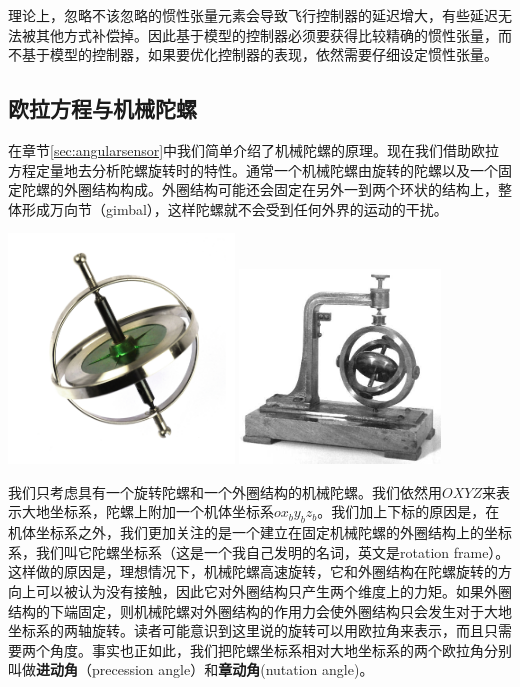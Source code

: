 \documentclass[11pt]{article}
\begin{document}
理论上，忽略不该忽略的惯性张量元素会导致飞行控制器的延迟增大，有些延迟无法被其他方式补偿掉。因此基于模型的控制器必须要获得比较精确的惯性张量，而不基于模型的控制器，如果要优化控制器的表现，依然需要仔细设定惯性张量。

\subsection{欧拉方程与机械陀螺}\label{sec:eulereqngyro}
在章节\ref{sec:angularsensor}中我们简单介绍了机械陀螺的原理。现在我们借助欧拉方程定量地去分析陀螺旋转时的特性。通常一个机械陀螺由旋转的陀螺以及一个固定陀螺的外圈结构构成。外圈结构可能还会固定在另外一到两个环状的结构上，整体形成万向节（gimbal），这样陀螺就不会受到任何外界的运动的干扰。

\includegraphics[width=0.45\textwidth]{images/gyro.jpg}
\includegraphics[width=0.4\textwidth]{images/gimbalgyro.jpg}

我们只考虑具有一个旋转陀螺和一个外圈结构的机械陀螺。我们依然用$OXYZ$来表示大地坐标系，陀螺上附加一个机体坐标系$ox_by_bz_b$。我们加上下标的原因是，在机体坐标系之外，我们更加关注的是一个建立在固定机械陀螺的外圈结构上的坐标系，我们叫它陀螺坐标系（这是一个我自己发明的名词，英文是rotation frame）。这样做的原因是，理想情况下，机械陀螺高速旋转，它和外圈结构在陀螺旋转的方向上可以被认为没有接触，因此它对外圈结构只产生两个维度上的力矩。如果外圈结构的下端固定，则机械陀螺对外圈结构的作用力会使外圈结构只会发生对于大地坐标系的两轴旋转。读者可能意识到这里说的旋转可以用欧拉角来表示，而且只需要两个角度。事实也正如此，我们把陀螺坐标系相对大地坐标系的两个欧拉角分别叫做\textbf{进动角}（precession angle）和\textbf{章动角}(nutation angle)。
\end{document}
